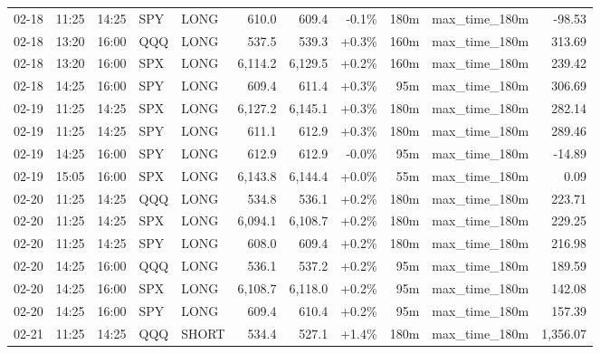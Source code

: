 \documentclass[11pt,a4paper,twoside]{article}
\begin{document}
\begin{center}
\begin{longtable}{>{\color{txtmain}}l l l l l r r r r >{\color{txtmain}}l r}
02-18 & 11:25 & 14:25 & SPY & LONG & 610.0 & 609.4 & \textcolor{lossred}{-0.1\%} & 180m & max\_time\_180m & \textcolor{lossred}{-98.53} \\
02-18 & 13:20 & 16:00 & QQQ & LONG & 537.5 & 539.3 & \textcolor{wingreen}{+0.3\%} & 160m & max\_time\_180m & \textcolor{wingreen}{313.69} \\
02-18 & 13:20 & 16:00 & SPX & LONG & 6,114.2 & 6,129.5 & \textcolor{wingreen}{+0.2\%} & 160m & max\_time\_180m & \textcolor{wingreen}{239.42} \\
02-18 & 14:25 & 16:00 & SPY & LONG & 609.4 & 611.4 & \textcolor{wingreen}{+0.3\%} & 95m & max\_time\_180m & \textcolor{wingreen}{306.69} \\
02-19 & 11:25 & 14:25 & SPX & LONG & 6,127.2 & 6,145.1 & \textcolor{wingreen}{+0.3\%} & 180m & max\_time\_180m & \textcolor{wingreen}{282.14} \\
02-19 & 11:25 & 14:25 & SPY & LONG & 611.1 & 612.9 & \textcolor{wingreen}{+0.3\%} & 180m & max\_time\_180m & \textcolor{wingreen}{289.46} \\
02-19 & 14:25 & 16:00 & SPY & LONG & 612.9 & 612.9 & \textcolor{lossred}{-0.0\%} & 95m & max\_time\_180m & \textcolor{lossred}{-14.89} \\
02-19 & 15:05 & 16:00 & SPX & LONG & 6,143.8 & 6,144.4 & \textcolor{wingreen}{+0.0\%} & 55m & max\_time\_180m & \textcolor{wingreen}{0.09} \\
02-20 & 11:25 & 14:25 & QQQ & LONG & 534.8 & 536.1 & \textcolor{wingreen}{+0.2\%} & 180m & max\_time\_180m & \textcolor{wingreen}{223.71} \\
02-20 & 11:25 & 14:25 & SPX & LONG & 6,094.1 & 6,108.7 & \textcolor{wingreen}{+0.2\%} & 180m & max\_time\_180m & \textcolor{wingreen}{229.25} \\
02-20 & 11:25 & 14:25 & SPY & LONG & 608.0 & 609.4 & \textcolor{wingreen}{+0.2\%} & 180m & max\_time\_180m & \textcolor{wingreen}{216.98} \\
02-20 & 14:25 & 16:00 & QQQ & LONG & 536.1 & 537.2 & \textcolor{wingreen}{+0.2\%} & 95m & max\_time\_180m & \textcolor{wingreen}{189.59} \\
02-20 & 14:25 & 16:00 & SPX & LONG & 6,108.7 & 6,118.0 & \textcolor{wingreen}{+0.2\%} & 95m & max\_time\_180m & \textcolor{wingreen}{142.08} \\
02-20 & 14:25 & 16:00 & SPY & LONG & 609.4 & 610.4 & \textcolor{wingreen}{+0.2\%} & 95m & max\_time\_180m & \textcolor{wingreen}{157.39} \\
02-21 & 11:25 & 14:25 & QQQ & SHORT & 534.4 & 527.1 & \textcolor{wingreen}{+1.4\%} & 180m & max\_time\_180m & \textcolor{wingreen}{1,356.07} \\

\end{longtable}
\end{center}
\end{document}
